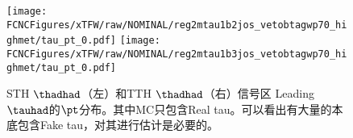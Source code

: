 \begin{figure}[H]
\centering
\texttt{[image: \\FCNCFigures/xTFW/raw/NOMINAL/reg2mtau1b2jos\_vetobtagwp70\_highmet/tau\_pt\_0.pdf]}
\texttt{[image: \\FCNCFigures/xTFW/raw/NOMINAL/reg2mtau1b3jos\_vetobtagwp70\_highmet/tau\_pt\_0.pdf]}
\caption{ STH $\thadhad$（左）和TTH $\thadhad$（右）信号区 Leading $\tauhad$的$\pt$分布。其中MC只包含Real tau。可以看出有大量的本底包含Fake tau，对其进行估计是必要的。}
\label{fig:os_pre_hadhad}
\end{figure}
